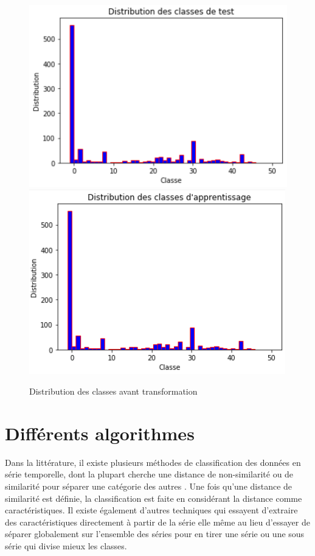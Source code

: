 \documentclass[french]{report}
\begin{document}
\begin{figure}[H]
	\includegraphics[scale = 0.6]{images/distribution_learn_supernova_all.PNG}
	\includegraphics[scale = 0.6]{images/distribution_test_supernova_all.PNG}
	\caption{Distribution des classes avant transformation}
\end{figure}

\section{Différents algorithmes}
Dans la littérature, il existe plusieurs méthodes de classification des données en série temporelle, dont la plupart cherche une distance de non-similarité ou de similarité pour séparer une catégorie des autres \cite{timereview}. Une fois qu'une distance de similarité est définie, la classification est faite en considérant la distance comme caractéristiques. Il existe également d'autres techniques qui essayent d'extraire des caractéristiques directement à partir de la série elle même au lieu d'essayer de séparer globalement sur l'ensemble des séries pour en tirer une série ou une sous série qui divise mieux les classes. 
\end{document}
